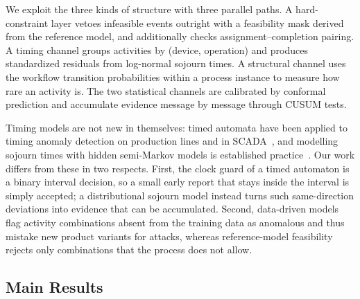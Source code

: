 \documentclass[manuscript,screen,review]{acmart}
\begin{document}
We exploit the three kinds of structure with three parallel paths. A hard-constraint layer vetoes infeasible events outright with a feasibility mask derived from the reference model, and additionally checks assignment--completion pairing. A timing channel groups activities by (device, operation) and produces standardized residuals from log-normal sojourn times. A structural channel uses the workflow transition probabilities within a process instance to measure how rare an activity is. The two statistical channels are calibrated by conformal prediction and accumulate evidence message by message through {CUSUM} tests.

Timing models are not new in themselves: timed automata have been applied to timing anomaly detection on production lines and in {SCADA}~\cite{maier2011timed,lin2018timing}, and modelling sojourn times with hidden semi-Markov models is established practice~\cite{tan2008hsmm}. Our work differs from these in two respects. First, the clock guard of a timed automaton is a binary interval decision, so a small early report that stays inside the interval is simply accepted; a distributional sojourn model instead turns such same-direction deviations into evidence that can be accumulated. Second, data-driven models flag activity combinations absent from the training data as anomalous and thus mistake new product variants for attacks, whereas reference-model feasibility rejects only combinations that the process does not allow.

\subsection{Main Results}
\label{sec:intro_results}
\end{document}
